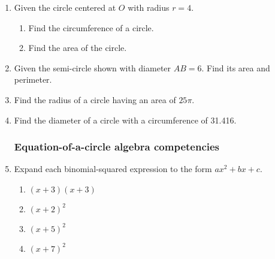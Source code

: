 \documentclass[12pt, twoside]{article}
\begin{document}
\begin{enumerate}
  \item Given the circle centered at $O$ with radius $r=4$.
  \begin{multicols}{2}
    \begin{enumerate}
      \item Find the circumference of a circle. %
      \item Find the area of the circle.\vspace{3cm}
    \end{enumerate}
  \end{multicols}

  \item Given the semi-circle shown with diameter $AB=6$. Find its area and perimeter.
    \begin{flushright}
  \end{flushright} \vspace{1cm}

  \item Find the radius of a circle having an area of $25 \pi$. \vspace{2cm}
  \item Find the diameter of a circle with a circumference of 31.416.

\newpage    
\subsubsection*{Equation-of-a-circle algebra competencies} 
  
  \item Expand each binomial-squared expression to the form $ax^2+bx+c$.
  \begin{multicols}{2}
  \begin{enumerate}[itemsep=3cm]
    \item $(x+3)(x+3)$
    \item $(x+2)^2$ 
    \item $(x+5)^2$ 
    \item $(x+7)^2$ 
  \end{enumerate}
  \end{multicols}\vspace{3cm}
  

\end{enumerate}
\end{document}
